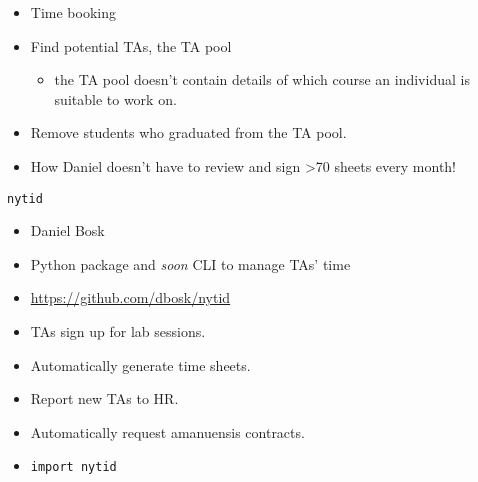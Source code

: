 \begin{frame}[fragile]\label<2>{WishTA}
  \begin{example}
    \begin{itemize}
      \item \alert{Time booking}

      \item \alert{Find potential TAs, the TA pool}
        \begin{itemize}
          \item \alert{the TA pool doesn't contain details of which course an 
            individual is suitable to work on.}
        \end{itemize}

      \item \alert{Remove students who graduated from the TA pool.}
    \end{itemize}
  \end{example}

  \pause

  \begin{example}[Bonus!]
   \begin{itemize}
     \item How Daniel doesn't have to review and sign >70 sheets every month!
   \end{itemize} \end{example}
\end{frame}

\begin{frame}[fragile]
  \begin{block}{\texttt{nytid}}
    \begin{itemize}
      \item Daniel Bosk
      \item Python package and \emph{soon} CLI to manage TAs' time
      \item \url{https://github.com/dbosk/nytid}
    \end{itemize}
  \end{block}

  \begin{example}
    \begin{itemize}
      \item TAs sign up for lab sessions.
      \item Automatically generate time sheets.
      \item Report new TAs to HR.
      \item Automatically request amanuensis contracts.

        \pause

      \item \texttt{import nytid}
    \end{itemize}
  \end{example}
\end{frame}

